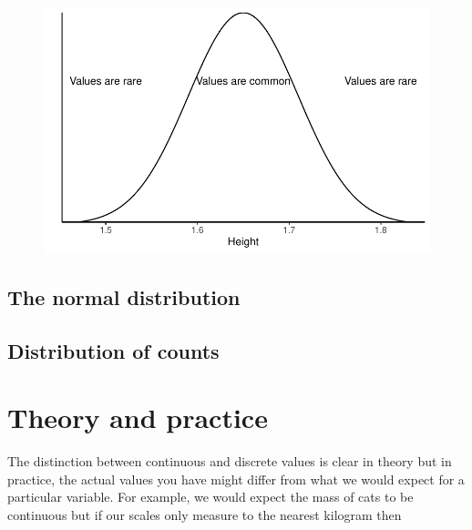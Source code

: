 \documentclass[
  letterpaper,
  DIV=11,
  numbers=noendperiod]{scrreprt}
\begin{document}
\begin{figure}[H]

{\centering \includegraphics{ideas_about_data_files/figure-pdf/unnamed-chunk-2-1.pdf}

}

\end{figure}

\hypertarget{the-normal-distribution}{%
\subsection{The normal distribution}\label{the-normal-distribution}}

\hypertarget{distribution-of-counts}{%
\subsection{Distribution of counts}\label{distribution-of-counts}}

\hypertarget{theory-and-practice}{%
\section{Theory and practice}\label{theory-and-practice}}

The distinction between continuous and discrete values is clear in
theory but in practice, the actual values you have might differ from
what we would expect for a particular variable. For example, we would
expect the mass of cats to be continuous but if our scales only measure
to the nearest kilogram then
\end{document}
